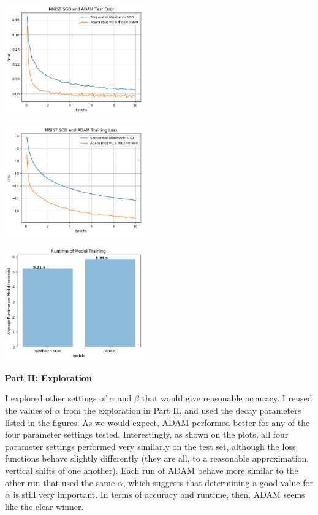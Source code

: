 \documentclass[10pt]{article}
\begin{document}
\begin{multicols}{2}
\begin{center}
\end{center}
\begin{center}
    \includegraphics[width=0.45\textwidth]{SGDandADAMTestError.png}
\end{center}
\begin{center}
    \includegraphics[width=0.45\textwidth]{SGDandADAMTrainingLoss.png}
\end{center} 

\begin{center}
    \includegraphics[width=0.45\textwidth]{train_time_part3.png}
\end{center}
\noindent
\textbf{Part II: Exploration} \par
I explored other settings of $\alpha$ and $\beta$ that would give reasonable accuracy. I reused the values of $\alpha$ from the exploration in Part II, and used the decay parameters listed in the figures. As we would expect, ADAM performed better for any of the four parameter settings tested. Interestingly, as shown on the plots, all four parameter settings performed very similarly on the test set, although the loss functions behave slightly differently (they are all, to a reasonable approximation, vertical shifts of one another). Each run of ADAM behave more similar to the other run that used the same $\alpha$, which suggests that determining a good value for $\alpha $ is still very important. In terms of accuracy and runtime, then, ADAM seems like the clear winner.\par


\end{multicols}
\end{document}
